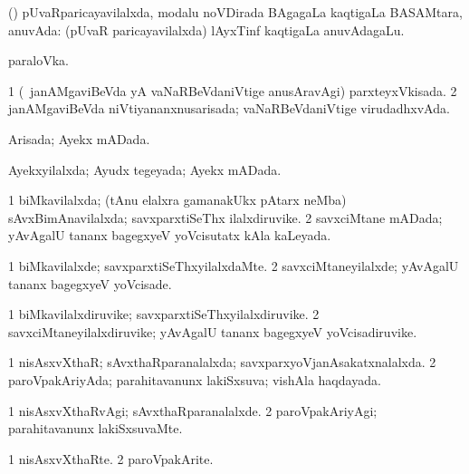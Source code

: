 \bentry
{} 
\gl{\nA}
\expl{}
\bmng
(\birx) pUvaRparicayavilalxda, modalu noVDirada BAgagaLa kaqtigaLa BASAMtara, anuvAda:  (pUvaR paricayavilalxda) lAyxTinf kaqtigaLa anuvAdagaLu. 
\emng

\noindent 
\gl{\pagu}
\expl{}
\bmng
{} paraloVka. 
\emng
\eentry

\bentry
{} 
\gl{\gu}
\expl{}
\bmng
\bnum
\num{1} (\kanmu\ janAMgaviBeVda yA vaNaRBeVdaniVtige anusAravAgi) parxteyxVkisada. 
\num{2} janAMgaviBeVda niVtiyananxnusarisada; vaNaRBeVdaniVtige virudadhxvAda. 
\enum
\emng
\eentry

\bentry
{} 
\gl{\gu}
\expl{}
\bmng
Arisada; Ayekx mADada. 
\emng
\eentry

\bentry
{} 
\gl{\gu}
\expl{}
\bmng
Ayekxyilalxda; Ayudx tegeyada; Ayekx mADada. 
\emng
\eentry

\bentry
{} 
\gl{\gu}
\expl{}
\bmng
\bnum
\num{1} biMkavilalxda; (tAnu elalxra gamanakUkx pAtarx neMba) sAvxBimAnavilalxda; savxparxtiSeThx ilalxdiruvike. 
\num{2} savxciMtane mADada; yAvAgalU tananx bagegxyeV yoVcisutatx kAla kaLeyada. 
\enum
\emng
\eentry

\bentry
{} 
\gl{\kirxvi}
\bmng
\bnum
\num{1} biMkavilalxde; savxparxtiSeThxyilalxdaMte. 
\num{2} savxciMtaneyilalxde; yAvAgalU tananx bagegxyeV yoVcisade. 
\enum
\emng
\eentry

\bentry
{} 
\gl{\nA}
\expl{}
\bmng
\bnum
\num{1} biMkavilalxdiruvike; savxparxtiSeThxyilalxdiruvike. 
\num{2} savxciMtaneyilalxdiruvike; yAvAgalU tananx bagegxyeV yoVcisadiruvike. 
\enum
\emng
\eentry

\bentry
{} 
\gl{\gu}
\expl{}
\bmng
\bnum
\num{1} nisAsxvXthaR; sAvxthaRparanalalxda; savxparxyoVjanAsakatxnalalxda. 
\num{2} paroVpakAriyAda; parahitavanunx lakiSxsuva; vishAla haqdayada. 
\enum
\emng
\eentry

\bentry
{} 
\gl{\kirxvi}
\bmng
\bnum
\num{1} nisAsxvXthaRvAgi; sAvxthaRparanalalxde. 
\num{2} paroVpakAriyAgi; parahitavanunx lakiSxsuvaMte. 
\enum
\emng
\eentry

\bentry
{} 
\gl{\nA}
\expl{}
\bmng
\bnum
\num{1} nisAsxvXthaRte. 
\num{2} paroVpakArite. 
\enum
\emng
\eentry

